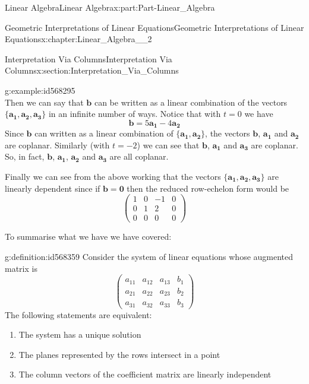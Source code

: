 \documentclass[oneside,10pt,]{book}
\numberwithin{equation}{section}
\newcommand{\amp}{&}
\begin{document}
\begin{partptx}{Linear Algebra}{}{Linear Algebra}{}{}{x:part:Part-Linear_Algebra}
\begin{chapterptx}{Geometric Interpretations of Linear Equations}{}{Geometric Interpretations of Linear Equations}{}{}{x:chapter:Linear_Algebra__2}
\begin{sectionptx}{Interpretation Via Columns}{}{Interpretation Via Columns}{}{}{x:section:Interpretation_Via_Columns}
\begin{example}{}{g:example:id568295}
\begin{equation*}
\end{equation*}
Then we can say that \(\mathbf{b}\) can be written as a linear combination of the vectors \(\{\mathbf{a_1, a_2, a_3}\}\)  in an infinite number of ways. Notice that with \(t=0\) we have%
\begin{equation*}
\mathbf{b}=5\mathbf{a_1}-4\mathbf{a_2}
\end{equation*}
Since \(\mathbf{b}\) can written as a linear combination of \(\{\mathbf{a_1, a_2}\}\), the vectors \(\mathbf{b}\), \(\mathbf{a_1}\) and \(\mathbf{a_2}\) are coplanar. Similarly (with \(t=-2\)) we can see that \(\mathbf{b}\), \(\mathbf{a_1}\) and \(\mathbf{a_3}\) are coplanar. So, in fact, \(\mathbf{b}\), \(\mathbf{a_1}\), \(\mathbf{a_2}\) and \(\mathbf{a_3}\) are all coplanar.%
\par
Finally we can see from the above working that the vectors \(\{\mathbf{a_1, a_2, a_3}\}\) are linearly dependent since if \(\mathbf{b=0}\) then the reduced row-echelon form would be%
\begin{equation*}
\begin{pmatrix} 1 \amp 0 \amp -1 \amp 0 \\ 0 \amp 1 \amp 2 \amp 0 \\ 0 \amp 0 \amp 0 \amp 0 \end{pmatrix}
\end{equation*}
%
\end{example}
To summarise what we have we have covered:%
\begin{definition}{}{g:definition:id568359}%
Consider the system of linear equations whose augmented matrix is%
\begin{equation*}
\begin{pmatrix} a_{11} \amp a_{12} \amp a_{13} \amp b_1 \\ a_{21} \amp a_{22} \amp a_{23} \amp b_2 \\ a_{31} \amp a_{32} \amp a_{33} \amp b_3 \end{pmatrix}
\end{equation*}
The following statements are equivalent:%
\begin{enumerate}[label=\arabic*.]
\item{}The system has a unique solution%
\item{}The planes represented by the rows intersect in a point%
\item{}The column vectors of the coefficient matrix are linearly independent%
\end{enumerate}
%
\end{definition}

\end{sectionptx}
\end{chapterptx}
\end{partptx}
\end{document}
